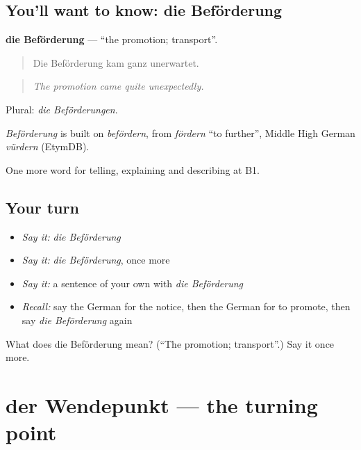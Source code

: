 \subsection*{You'll want to know: die Beförderung}
\textbf{die Beförderung} — \textquotedblleft{}the promotion; transport\textquotedblright{}.

\begin{quote}
Die Beförderung kam ganz unerwartet.
\end{quote}

\begin{quote}
\emph{The promotion came quite unexpectedly.}
\end{quote}

Plural: \emph{die Beförderungen}.

\begin{cousinweb}
\emph{Beförderung} is built on \emph{befördern}, from \emph{fördern} \textquotedblleft{}to further\textquotedblright{}, Middle High German \emph{vürdern} (EtymDB).
\end{cousinweb}

\begin{grammarlens}[title={What you've built}]
One more word for telling, explaining and describing at B1.
\end{grammarlens}

\subsection*{Your turn}
\begin{itemize}
\raggedright
  \item \emph{Say it:} \emph{die Beförderung}
  \item \emph{Say it:} \emph{die Beförderung}, once more
  \item \emph{Say it:} a sentence of your own with \emph{die Beförderung}
  \item \emph{Recall:} say the German for the notice, then the German for to promote, then say \emph{die Beförderung} again
\end{itemize}

\begin{tcolorbox}[breakable,colback=teal!4,colframe=teal!35!black,title={Before you move on}]
What does die Beförderung mean? (\textquotedblleft{}The promotion; transport\textquotedblright{}.) Say it once more.
\end{tcolorbox}
\section[der Wendepunkt]{der Wendepunkt — the turning point}


